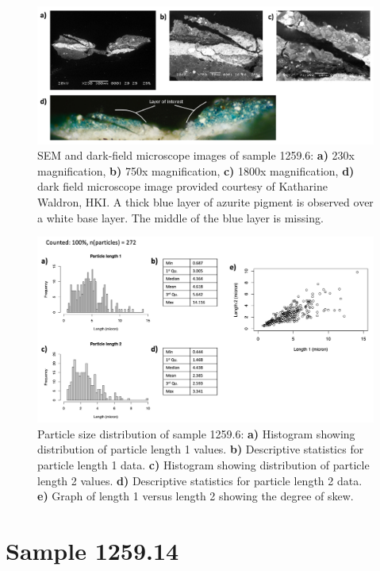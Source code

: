 \begin{figure}[H]
  \centering
  \includegraphics[width=\linewidth]{1259-6_imgs}
\caption[SEM and dark-field microscope images of sample 1259.6.]{SEM and dark-field microscope images of sample 1259.6: \textbf{a)} 230x magnification, \textbf{b)} 750x magnification, \textbf{c)} 1800x magnification, \textbf{d)} dark field microscope image provided courtesy of Katharine Waldron, HKI. A thick blue layer of azurite pigment is observed over a white base layer. The middle of the blue layer is missing.}
\label{fig:1259.6_imgs}
\end{figure}


\begin{figure}[H]
\centering
  \includegraphics[width=0.9\linewidth]{1259-6_partsize}
\caption[Particle size distribution, sample 1259.6.]{Particle size distribution of sample 1259.6: \textbf{a)} Histogram showing distribution of particle length 1 values. \textbf{b)} Descriptive statistics for particle length 1 data. \textbf{c)} Histogram showing distribution of particle length 2 values. \textbf{d)} Descriptive statistics for particle length 2 data. \textbf{e)} Graph of length 1 versus length 2 showing the degree of skew.}
\label{fig:1259.6_partsize}
\end{figure}


\section{Sample 1259.14}

